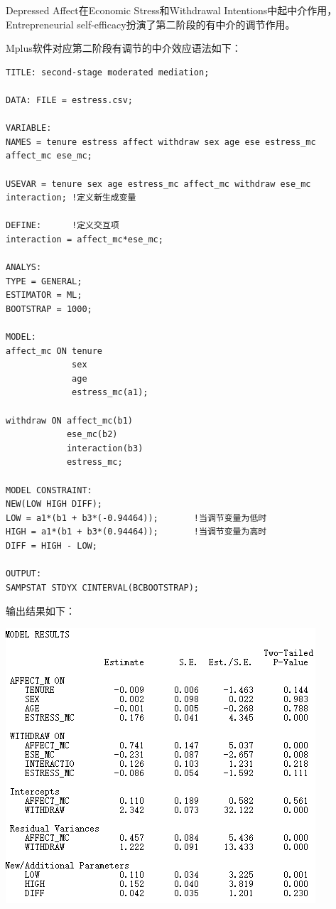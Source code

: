 \documentclass[
]{book}
\begin{document}
Depressed Affect在Economic Stress和Withdrawal Intentions中起中介作用，Entrepreneurial self-efficacy扮演了第二阶段的有中介的调节作用。

Mplus软件对应第二阶段有调节的中介效应语法如下：

\begin{verbatim}
TITLE: second-stage moderated mediation;

DATA: FILE = estress.csv;

VARIABLE:
NAMES = tenure estress affect withdraw sex age ese estress_mc affect_mc ese_mc;

USEVAR = tenure sex age estress_mc affect_mc withdraw ese_mc interaction; !定义新生成变量

DEFINE:      !定义交互项
interaction = affect_mc*ese_mc;

ANALYS:
TYPE = GENERAL;
ESTIMATOR = ML;
BOOTSTRAP = 1000;

MODEL:
affect_mc ON tenure
             sex
             age
             estress_mc(a1);

withdraw ON affect_mc(b1)
            ese_mc(b2)
            interaction(b3)
            estress_mc;

MODEL CONSTRAINT:
NEW(LOW HIGH DIFF);
LOW = a1*(b1 + b3*(-0.94464));       !当调节变量为低时
HIGH = a1*(b1 + b3*(0.94464));       !当调节变量为高时
DIFF = HIGH - LOW;

OUTPUT:
SAMPSTAT STDYX CINTERVAL(BCBOOTSTRAP);
\end{verbatim}

输出结果如下：

\includegraphics{figs/1147.png}
\end{document}
